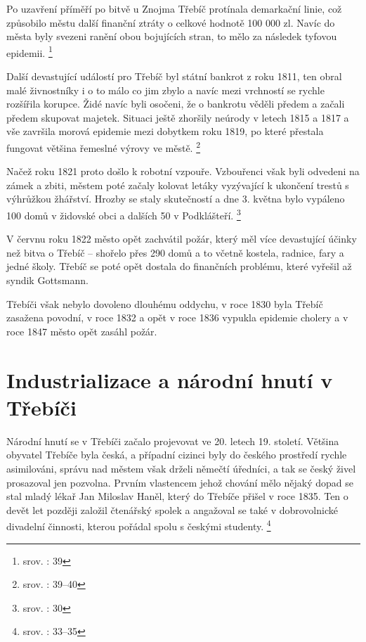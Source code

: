 \documentclass[a4paper,oneside,12p]{report}
\begin{document}
Po uzavření příměří po bitvě u Znojma Třebíč protínala demarkační linie, což způsobilo městu další finanční ztráty o celkové hodnotě 100 000 zl.
Navíc do města byly svezeni ranění obou bojujících stran, to mělo za následek tyfovou epidemii. \footnote{srov. \cite{Janak1981}: 39}

Další devastující událostí pro Třebíč byl státní bankrot z roku 1811, ten obral malé živnostníky i o to málo co jim zbylo a navíc mezi vrchností se rychle rozšířila korupce.
Židé navíc byli osočeni, že o bankrotu věděli předem a začali předem skupovat majetek.
Situaci ještě zhoršily neúrody v letech 1815 a 1817 a vše završila morová epidemie mezi dobytkem roku 1819, po které přestala fungovat většina řemeslné výrovy ve městě. \footnote{srov. \cite{Janak1981}: 39--40}

Načež roku 1821 proto došlo k robotní vzpouře.
Vzbouřenci však byli odvedeni na zámek a zbiti, městem poté začaly kolovat letáky vyzývající k ukončení trestů s výhrůžkou žhářství.
Hrozby se staly skutečností a dne 3. května bylo vypáleno 100 domů v židovské obci a dalších 50 v Podklášteří. \footnote{srov. \cite{Janak1981}: 30}

V červnu roku 1822 město opět zachvátil požár, který měl více devastující účinky než bitva o Třebíč -- shořelo přes 290 domů a to včetně kostela, radnice, fary a jedné školy.
Třebíč se poté opět dostala do finančních problému, které vyřešil až syndik Gottsmann.

Třebíči však nebylo dovoleno dlouhému oddychu, v roce 1830 byla Třebíč zasažena povodní, v roce 1832 a opět v roce 1836 vypukla epidemie cholery a v roce 1847 město opět zasáhl požár.


\section{Industrializace a národní hnutí v Třebíči}

Národní hnutí se v Třebíči začalo projevovat ve 20. letech 19. století.
Většina obyvatel Třebíče byla česká, a případní cizinci byly do českého prostředí rychle asimilováni, správu nad městem však drželi němečtí úředníci, a tak se český živel prosazoval jen pozvolna.
Prvním vlastencem jehož chování mělo nějaký dopad se stal mladý lékař Jan Miloslav Haněl, který do Třebíče přišel v roce 1835.
Ten o devět let později založil čtenářský spolek a angažoval se také v dobrovolnické divadelní činnosti, kterou pořádal spolu s českými studenty. \footnote{srov. \cite{Janak1981}: 33--35}
\end{document}
